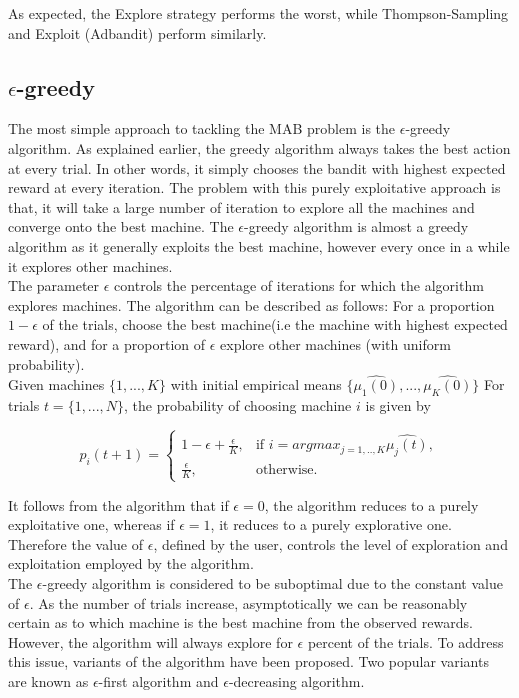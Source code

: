 \documentclass{article}
\begin{document}
As expected, the Explore strategy performs the worst, while Thompson-Sampling and Exploit (Adbandit) perform similarly. 

\subsection{$\epsilon$-greedy}

The most simple approach to tackling the MAB problem is the $\epsilon$-greedy algorithm. As explained earlier, the greedy algorithm always takes the best action at every trial. In other words, it simply chooses the bandit with highest expected reward at every iteration. The problem with this purely exploitative approach is that, it will take a large number of iteration to explore all the machines and converge onto the best machine. The $\epsilon$-greedy algorithm is almost a greedy algorithm as it generally exploits the best machine, however every once in a while it explores other machines.\\ 

The parameter $\epsilon$ controls the percentage of iterations for which the algorithm explores machines. The algorithm can be described as follows: For a proportion $1 - \epsilon$ of the trials, choose the best machine(i.e the machine with highest expected reward), and for a proportion of $\epsilon$ explore other machines (with uniform probability).\\

Given machines $\{1,...,K\}$ with initial empirical means $\{\hat{\mu_1(0)},...,\hat{\mu_K(0)}\}$ For trials $t = \{1,...,N\}$, the probability of choosing machine $i$ is given by

$$p_i(t+1) = \begin{cases}
  1- \epsilon + \frac{\epsilon}{K}, & \text{if } i = argmax_{j=1,..,K}\hat{\mu_j(t)}, \\
  \frac{\epsilon}{K}, & \text{otherwise}.
\end{cases}$$


It follows from the algorithm that if $\epsilon = 0$, the algorithm reduces to a purely exploitative one, whereas if $\epsilon = 1$, it reduces to a purely explorative one. Therefore the value of $\epsilon$, defined by the user, controls the level of exploration and exploitation employed by the algorithm.\\

The $\epsilon$-greedy algorithm is considered to be suboptimal due to the constant value of $\epsilon$. As the number of trials increase, asymptotically we can be reasonably certain as to which machine is the best machine from the observed rewards. However, the algorithm will always explore for $\epsilon$ percent of the trials. To address this issue, variants of the algorithm have been proposed. Two popular variants are known as $\epsilon$-first algorithm and $\epsilon$-decreasing algorithm.\\
\end{document}
